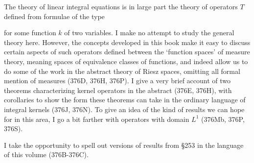 \def\esssup{\mathop{\text{ess sup}}}

\def\chaptername{Linear operators between function spaces}
\def\sectionname{Kernel operators}


The theory of linear integral equations is in large part the theory of
operators $T$ defined from formulae of the type


\noindent for some function $k$ of two variables.   I make no attempt to
study the general theory here.   However, the concepts developed in this
book make it easy to discuss certain aspects of such operators defined
between the `function spaces' of measure theory, meaning spaces of
equivalence classes of functions, and indeed allow us to do some of the
work in the abstract theory of Riesz spaces, omitting all formal mention
of measures (376D, 376H, 376P).   I give a very brief account of two
theorems characterizing kernel operators in the abstract (376E, 376H),
with corollaries to show the form these theorems can take in the
ordinary language of integral kernels (376J, 376N).   To give an idea of
the kind of results we can hope for in this area, I go a bit farther
with operators with domain $L^1$ (376Mb, 376P, 376S).

I take the opportunity to spell out versions of results from \S253 in
the language of this volume (376B-376C).

